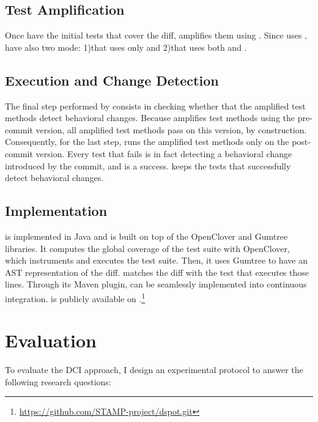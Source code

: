 \subsection{Test Amplification}
\label{sec:dci:techniques:amplification}

Once \DCI have the initial tests that cover the diff, \DCI amplifies them using \dspot.
Since \DCI uses \dspot, \DCI have also two mode:
1)\DCIA that uses only \Aampl and
2)\DCII that uses both \Aampl and \Iampl.

\subsection{Execution and Change Detection}
\label{sec:dci:techniques:execution-change-detection}

The final step performed by \DCI consists in checking whether that the amplified test methods detect behavioral changes.
Because \DCI amplifies test methods using the pre-commit version, all amplified test methods pass on this version, by construction. 
Consequently, for the last step, \DCI runs the amplified test methods only on the post-commit version. 
Every test that fails is in fact detecting a behavioral change introduced by the commit, and is a success. \DCI keeps the tests that successfully detect behavioral changes.

\subsection{Implementation}
\label{sec:dci:techniques:implementation}

\DCI is implemented in Java and is built on top of the OpenClover and Gumtree~\cite{falleri:hal-01054552} libraries.
It computes the global coverage of the test suite with OpenClover, which instruments and executes the test suite.
Then, it uses Gumtree to have an AST representation of the diff.
\DCI matches the diff with the test that executes those lines. 
Through its Maven plugin, \DCI can be seamlessly implemented into continuous integration.
\DCI is publicly available on \gh.\footnote{\url{https://github.com/STAMP-project/dspot.git}}

\section{Evaluation}
\label{sec:dci:evaluation}

To evaluate the DCI approach, I design an experimental protocol to answer the following research questions:

